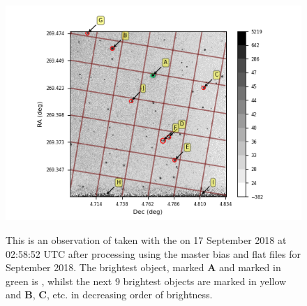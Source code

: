 \begin{figure}[!htbp]
\begin{center}
\includegraphics[scale=1]{images/initgexample.png}
\end{center}   
\caption{This is an observation of {\bstar} taken with the {\gfilter} on
17 September 2018 at 02:58:52 UTC after processing using the master bias and
flat files for September 2018. The brightest object, marked \textbf{A} and marked in
green is \bstar, whilst the next 9 brightest objects are marked in yellow and
\textbf{B}, \textbf{C}, etc. in decreasing order of brightness.}
\protect\label{fig:initgexample}
\end{figure}


